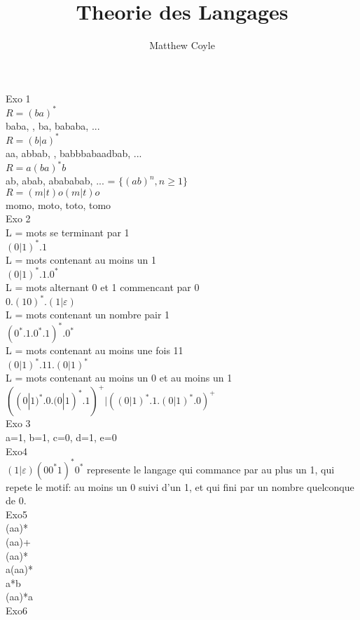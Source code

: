\documentclass{article}
\author{Matthew Coyle}
\title{Theorie des Langages}
\begin{document}
Exo 1\\
$R = (ba)^*$\\
baba, , ba, bababa, ...\\


$R=(b|a)^*$\\
aa, abbab, , babbbabaadbab, ...\\


$R=a(ba)^*b$\\
ab, abab, abababab, ... = $ \{(ab)^n , n \geq 1\} $\\


$R=(m|t)o(m|t)o$\\
momo, moto, toto, tomo\\


Exo 2\\
L = {mots se terminant par 1}\\
$ (0|1)^*.1 $\\

L = {mots contenant au moins un 1}\\
$ (0|1)^*.1.0^* $\\

L = {mots alternant 0 et 1 commencant par 0}\\
$ 0.(10)^*.(1|\varepsilon) $\\

L = {mots contenant un nombre pair 1}\\
$ (0^*.1.0^*.1)^*.0^* $\\

L = {mots contenant au moins une fois 11}\\
$(0|1)^*.11.(0|1)^*$\\

L = {mots contenant au moins un 0 et au moins un 1}\\
$ ((0|1)^*.0.(0|1)^*.1)^+ | ((0|1)^*.1.(0|1)^*.0)^+ $\\


Exo 3\\
a=1, b=1, c=0, d=1, e=0\\

Exo4\\
$ (1|\varepsilon)(00^*1)^*0^* $ represente le langage qui commance par au plus un 1, qui repete le motif: au moins un 0 suivi d'un 1, et qui fini par un nombre quelconque de 0.\\


Exo5\\
(aa)*\\ 
(aa)+\\
(aa)*\\
a(aa)*\\
a*b\\
(aa)*a\\

Exo6\\
\end{document}
